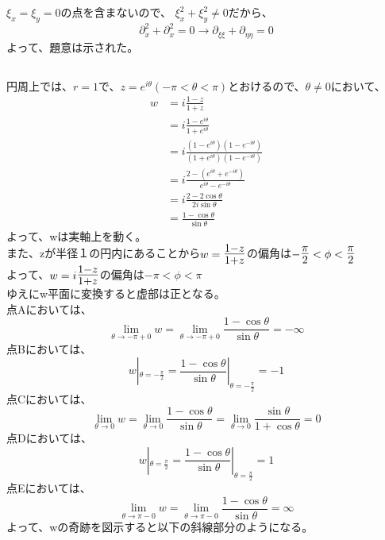\documentclass[dvipdfmx,a4paper]{jsarticle}
\begin{document}
$\xi_x = \xi_y = 0$の点を含まないので、 $\xi_x^2 + \xi_y^2 \neq 0$だから、
$$
\partial_x^2 + \partial_x^2 = 0 \to \partial_{\xi\xi} + \partial_{\eta\eta} = 0
$$
よって、題意は示された。\\

\subsection{}
円周上では、$r = 1$で、$z = e^{i\theta}(-\pi < \theta < \pi)$とおけるので、$\theta\neq 0$において、
\begin{align*}
w &= i\frac{1-z}{1+z}\\
&= i\frac{1-e^{i\theta}}{1+e^{i\theta}}\\
&=i\frac{(1-e^{i\theta})(1-e^{-i\theta})}{(1+e^{i\theta})(1-e^{-i\theta})}\\
&=i\frac{2 - (e^{i\theta} + e^{-i\theta})}{e^{i\theta} - e^{-i\theta}}\\
&= i\frac{2 - 2\cos{\theta}}{2i\sin{\theta}}\\
&= \frac{1-\cos{\theta}}{\sin{\theta}}
\end{align*}
よって、wは実軸上を動く。\\
また、zが半径１の円内にあることから$w = \mbox{\Large$\frac{1-z}{1+z}$}$の偏角は$-\mbox{\Large $\frac{\pi}{2}$} < \phi < \mbox{\Large $\frac{\pi}{2}$}$\\
よって、$w = i\mbox{\Large$\frac{1-z}{1+z}$}$の偏角は$-\pi < \phi < \pi$\\
ゆえにw平面に変換すると虚部は正となる。\\
点Aにおいては、
$$
\lim_{\theta \to -\pi+0}w = \lim_{\theta \to -\pi+0}\frac{1-\cos{\theta}}{\sin{\theta}} = -\infty
$$
点Bにおいては、
$$
w|_{\theta = -\frac{\pi}{2}} = \frac{1-\cos{\theta}}{\sin{\theta}}|_{\theta = -\frac{\pi}{2}} = -1
$$
点Cにおいては、
$$
\lim_{\theta \to 0}w = \lim_{\theta \to 0}\frac{1-\cos{\theta}}{\sin{\theta}} = \lim_{\theta \to 0}\frac{\sin{\theta}}{1 + \cos{\theta}} = 0
$$
点Dにおいては、
$$
w|_{\theta = \frac{\pi}{2}} = \frac{1-\cos{\theta}}{\sin{\theta}}|_{\theta = \frac{\pi}{2}} = 1
$$
点Eにおいては、
$$
\lim_{\theta \to \pi-0}w = \lim_{\theta \to \pi-0}\frac{1-\cos{\theta}}{\sin{\theta}} = \infty
$$
よって、wの奇跡を図示すると以下の斜線部分のようになる。\\
\end{document}
